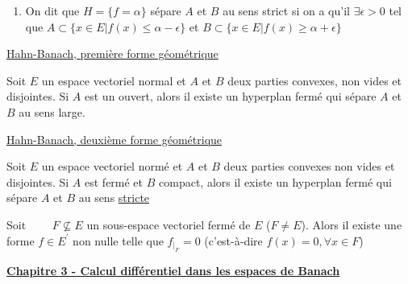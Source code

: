 \documentclass[12pt,a4paper]{article}
\begin{document}
\begin{flushleft}
\begin{mydef}
\begin{enumerate}
\item On dit que $H = \{ f = \alpha \}$ sépare $A$ et $B$ au sens strict si on a qu'il $\exists \epsilon >0$ tel que $ A \subset \{ x \in E | f(x) \leq \alpha - \epsilon \}$ et $B \subset \{ x \in E | f(x) \geq \alpha + \epsilon \}$
\end{enumerate}
\end{mydef}


\underline{Hahn-Banach, première forme géométrique}



\begin{thm}
Soit $E$ un espace vectoriel normal et $A$ et $B$ deux parties convexes, non vides et disjointes. Si $A$ est un ouvert, alors il existe un hyperplan fermé qui sépare $A$ et $B$ au sens large.
\end{thm}

\underline{Hahn-Banach, deuxième forme géométrique}
\begin{thm}
Soit $E$ un espace vectoriel normé et $A$ et $B$ deux parties convexes non vides et disjointes. Si $A$ est fermé et $B$ compact, alors il existe un hyperplan fermé qui sépare $A$ et $B$ au sens \underline{stricte}
\end{thm}

\begin{cor}
Soit $\qquad F \nsubseteq E$ un sous-espace vectoriel fermé de $E$ ($F \neq E$). Alors il existe une forme $f \in E^\prime$ non nulle telle que $f_{|_F} = 0$ (c'est-à-dire $f(x) = 0, \forall x \in F$)
\end{cor}

\textbf{\underline{Chapitre 3 - Calcul différentiel dans les espaces de Banach}}\\~\\




































\end{flushleft}
\end{document}
